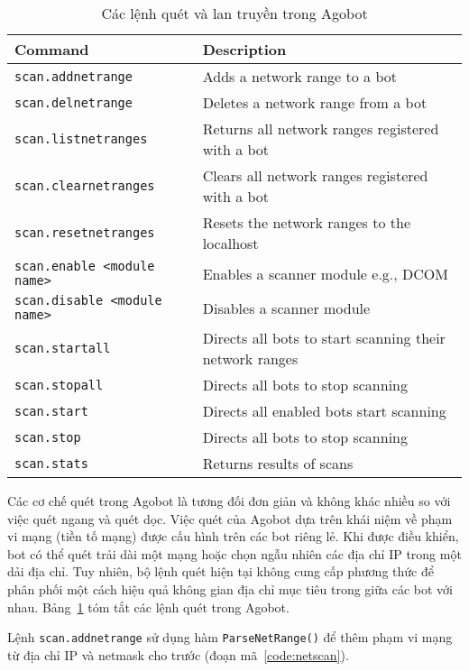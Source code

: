 \begin{table}[ht]
	\caption{Các lệnh quét và lan truyền trong Agobot}
	\label{table:botprog}
	\centering
	\footnotesize
	\begin{tabular}{l l}
		\toprule
		\textbf{Command} &
		\textbf{Description} \\
		\midrule
		\texttt{scan.addnetrange} & Adds a network range to a bot\\
		\texttt{scan.delnetrange} & Deletes a network range from a bot\\
		\texttt{scan.listnetranges} & Returns all network ranges registered with a bot\\
		\texttt{scan.clearnetranges} & Clears all network ranges registered with a bot\\
		\texttt{scan.resetnetranges} & Resets the network ranges to the localhost\\
		\texttt{scan.enable <module name>} & Enables a scanner module e.g., DCOM\\
		\texttt{scan.disable <module name>} & Disables a scanner module\\
		\texttt{scan.startall} & Directs all bots to start scanning their network ranges\\
		\texttt{scan.stopall} & Directs all bots to stop scanning\\
		\texttt{scan.start} & Directs all enabled bots start scanning\\
		\texttt{scan.stop} & Directs all bots to stop scanning\\
		\texttt{scan.stats} & Returns results of scans\\
		\bottomrule
	\end{tabular}
\end{table}

Các cơ chế quét trong Agobot là tương đối đơn giản và không khác nhiều so với việc quét ngang và quét dọc.
Việc quét của Agobot dựa trên khái niệm về phạm vi mạng (tiền tố mạng) được cấu hình trên các bot riêng lẻ.
Khi được điều khiển, bot có thể quét trải dài một mạng hoặc chọn ngẫu nhiên các địa chỉ IP trong một dải địa chỉ.
Tuy nhiên, bộ lệnh quét hiện tại không cung cấp phương thức để phân phối một cách hiệu quả không gian địa chỉ mục tiêu trong giữa các bot với nhau. Bảng~\ref{table:botprog} tóm tắt các lệnh quét trong Agobot.

\begin{exmp}
Lệnh \texttt{scan.addnetrange} sử dụng hàm \texttt{ParseNetRange()} để thêm phạm vi mạng từ
địa chỉ IP và netmask cho trước (đoạn mã~\ref{code:netscan}).
\end{exmp}

